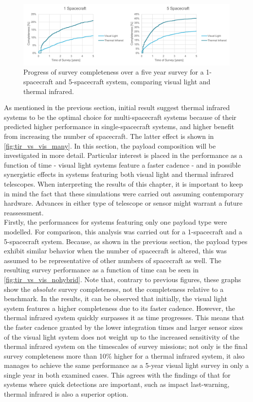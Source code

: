 \begin{figure}[htbp]
 \centering
 \includegraphics[width=1.0\textwidth]{img/tir_vs_vis_1_5.pdf}
 \caption{Progress of survey completeness over a five year survey for a 1-spacecraft and 5-spacecraft system, comparing visual light and thermal infrared.}
 \label{fig:tir_vs_vis_nohybrid}
\end{figure}


As mentioned in the previous section, initial result suggest thermal infrared systems to be the optimal choice for multi-spacecraft systems because of their predicted higher performance in single-spacecraft systems, and higher benefit from increasing the number of spacecraft. The latter effect is shown in \autoref{fig:tir_vs_vis_many}. In this section, the payload composition will be investigated in more detail. Particular interest is placed in the performance as a function of time - visual light systems feature a faster cadence - and in possible synergistic effects in systems featuring both visual light and thermal infrared telescopes. When interpreting the results of this chapter, it is important to keep in mind the fact that these simulations were carried out assuming contemporary hardware. Advances in either type of telescope or sensor might warrant a future reassessment.\\

Firstly, the performances for systems featuring only one payload type were modelled. For comparison, this analysis was carried out for a 1-spacecraft and a 5-spacecraft system. Because, as shown in the previous section, the payload types exhibit similar behavior when the number of spacecraft is altered, this was assumed to be representative of other numbers of spacecraft as well. The resulting survey performance as a function of time can be seen in \autoref{fig:tir_vs_vis_nohybrid}. Note that, contrary to previous figures, these graphs show the \textit{absolute} survey completeness, not the completeness relative to a benchmark. In the results, it can be observed that initially, the visual light system features a higher completeness due to its faster cadence. However, the thermal infrared system quickly surpasses it as time progresses. This means that the faster cadence granted by the lower integration times and larger sensor sizes of the visual light system does not weight up to the increased sensitivity of the thermal infrared system on the timescales of survey missions; not only is the final survey completeness more than 10\% higher for a thermal infrared system, it also manages to achieve the same performance as a 5-year visual light survey in only a single year in both examined cases. This agrees with the findings of \cite{ThesisOlga} that for systems where quick detections are important, such as impact last-warning, thermal infrared is also a superior option. \\

